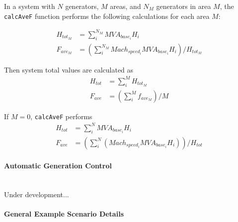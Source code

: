 \documentclass[12pt]{article}
\begin{document}
In a system with $N$ generators, $M$ areas, and $N_M$ generators in area $M$, the \verb|calcAveF| function performs the following calculations for each area $M$:

\begin{align*}
%             
%         
H_{tot_M} &= \sum_{i}^{N_M} MVA_{base_i}H_i \\
F_{ave_M} &= \left( \sum_{i}^{N_M}Mach_{speed_i}MVA_{base_i}H_i \right) / H_{tot_M}
\end{align*}

Then system total values are calculated as
\begin{align*}
H_{tot} &= \sum_{i}^{M} H_{tot_M} \\
F_{ave} &= \left( \sum_{i}^{M} f_{ave_M} \right)/M
\end{align*}

If $M=0$, \verb|calcAveF| performs
\begin{align*}
H_{tot} &= \sum_{i}^{N} MVA_{base_i}H_i \\
F_{ave} &= \left( \sum_{i}^{N}(Mach_{speed_i}MVA_{base_i}H_i) \right) / H_{tot}
\end{align*}

\paragraph{Automatic Generation Control} \ \\
Under development...


\pagebreak
\paragraph{General Example Scenario Details} \ \\
\end{document}

